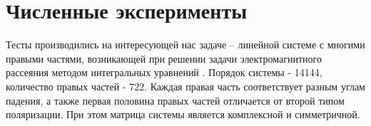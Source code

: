 \section{Численные эксперименты}
\label{sec:Chapter4} 

\par Тесты производились на интересующей нас задаче – линейной системе с многими 
правыми частями, возникающей при решении задачи электромагнитного рассеяния 
методом интегральных уравнений \cite{stavtsev2009application}. Порядок системы - 14144, количество правых частей - 722.
Каждая правая часть соответствует разным углам падения, а также первая половина правых частей отличается от второй типом поляризации. 
При этом матрица системы является комплексной и симметричной.
